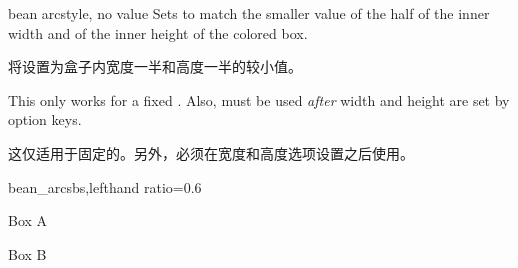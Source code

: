   
  \begin{docTcbKey}[][doc new=2015-05-05]{bean arc}{}{style, no value}
  Sets  to match the smaller value of the
  half of the inner width and of the inner height of the colored box.
  
  
  将设置为盒子内宽度一半和高度一半的较小值。

  \begin{marker}
  This only works for a fixed . Also, 
  must be used \emph{after} width and height are set by option keys.
  
  这仅适用于固定的。另外，必须在宽度和高度选项设置之后使用。
  \end{marker}
  \begin{exdispExample*}{bean_arc}{sbs,lefthand ratio=0.6}
  
  \begin{tcolorbox}[width=3cm,height=2cm,
  bean arc]
  Box A
  \end{tcolorbox}
  
  \begin{tcolorbox}[width=2cm,height=3cm,
  bean arc]
  Box B
  \end{tcolorbox}
  \end{exdispExample*}
  \end{docTcbKey}
  
